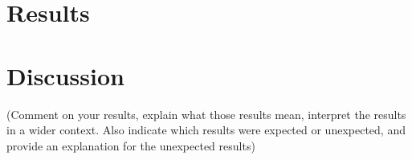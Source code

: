 \section{Results}


\section*{Discussion}
(Comment on your results, explain what those results mean, interpret the results in a wider context. Also indicate which results were expected or unexpected, and provide an explanation for the unexpected results)

